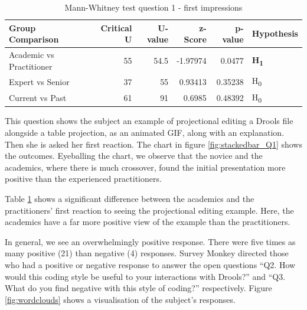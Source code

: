 \begin{table}[h]
    \begin{center}
        \begin{tabular}{ |l ||r |r |r | r|l | } 
            \hline
            Group Comparison                 & Critical U & U-value & z-Score  & p-value & Hypothesis         \\
            \hline
            \hline
            Academic vs Practitioner         & 55         & 54.5    & -1.97974 & 0.0477  & \textbf{H\textsubscript{1}}  \\ 
            \hline
            Expert vs Senior                 & 37         & 55      & 0.93413  & 0.35238 & H\textsubscript{0} \\ 
            \hline
            Current vs Past                  & 61         & 91      & 0.6985   & 0.48392 & H\textsubscript{0} \\ 
            \hline
        \end{tabular}
    \end{center}
    \caption{Mann-Whitney test question 1 - first impressions}
    \label{table:mannwhitneyQ1}
\end{table}

This question shows the subject an example of projectional editing a Drools file alongside a table projection, as an animated GIF, along with an explanation.
Then she is asked her first reaction. 
The chart in figure \ref{fig:stackedbar_Q1} shows the outcomes.
Eyeballing the chart, we observe that the novice and the academics, where there is much crossover, found the initial presentation more positive than the experienced practitioners.

Table \ref{table:mannwhitneyQ1} shows a significant difference between the academics and the practitioners' first reaction to seeing the projectional editing example.
Here, the academics have a far more positive view of the example than the practitioners.

In general, we see an overwhelmingly positive response.
There were five times as many positive (21) than negative (4) responses.
Survey Monkey directed those who had a positive or negative response to answer the open questions ``Q2. How would this coding style be useful to your interactions with Drools?'' and ``Q3. What do you find negative with this style of coding?'' respectively.
Figure \ref{fig:wordclouds} shows a visualisation of the subject's responses.

